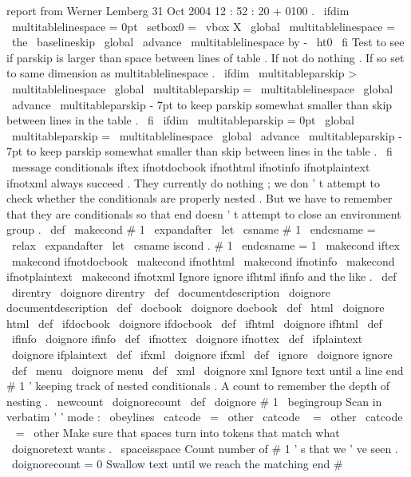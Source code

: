 {{report
from
Werner
Lemberg
31
Oct
2004
12
:
52
:
20
+
0100
.
\
ifdim
\
multitablelinespace
=
0pt
\
setbox0
=
\
vbox
{
X
}
\
global
\
multitablelinespace
=
\
the
\
baselineskip
\
global
\
advance
\
multitablelinespace
by
-
\
ht0
\
fi
%
%
Test
to
see
if
parskip
is
larger
than
space
between
lines
of
%
%
table
.
If
not
do
nothing
.
%
%
If
so
set
to
same
dimension
as
multitablelinespace
.
\
ifdim
\
multitableparskip
>
\
multitablelinespace
\
global
\
multitableparskip
=
\
multitablelinespace
\
global
\
advance
\
multitableparskip
-
7pt
%
%
to
keep
parskip
somewhat
smaller
%
%
than
skip
between
lines
in
the
table
.
\
fi
%
\
ifdim
\
multitableparskip
=
0pt
\
global
\
multitableparskip
=
\
multitablelinespace
\
global
\
advance
\
multitableparskip
-
7pt
%
%
to
keep
parskip
somewhat
smaller
%
%
than
skip
between
lines
in
the
table
.
\
fi
}
\
message
{
conditionals
}
%
iftex
ifnotdocbook
ifnothtml
ifnotinfo
ifnotplaintext
%
ifnotxml
always
succeed
.
They
currently
do
nothing
;
we
don
'
t
%
attempt
to
check
whether
the
conditionals
are
properly
nested
.
But
we
%
have
to
remember
that
they
are
conditionals
so
that
end
doesn
'
t
%
attempt
to
close
an
environment
group
.
%
\
def
\
makecond
#
1
{
%
\
expandafter
\
let
\
csname
#
1
\
endcsname
=
\
relax
\
expandafter
\
let
\
csname
iscond
.
#
1
\
endcsname
=
1
}
\
makecond
{
iftex
}
\
makecond
{
ifnotdocbook
}
\
makecond
{
ifnothtml
}
\
makecond
{
ifnotinfo
}
\
makecond
{
ifnotplaintext
}
\
makecond
{
ifnotxml
}
%
Ignore
ignore
ifhtml
ifinfo
and
the
like
.
%
\
def
\
direntry
{
\
doignore
{
direntry
}
}
\
def
\
documentdescription
{
\
doignore
{
documentdescription
}
}
\
def
\
docbook
{
\
doignore
{
docbook
}
}
\
def
\
html
{
\
doignore
{
html
}
}
\
def
\
ifdocbook
{
\
doignore
{
ifdocbook
}
}
\
def
\
ifhtml
{
\
doignore
{
ifhtml
}
}
\
def
\
ifinfo
{
\
doignore
{
ifinfo
}
}
\
def
\
ifnottex
{
\
doignore
{
ifnottex
}
}
\
def
\
ifplaintext
{
\
doignore
{
ifplaintext
}
}
\
def
\
ifxml
{
\
doignore
{
ifxml
}
}
\
def
\
ignore
{
\
doignore
{
ignore
}
}
\
def
\
menu
{
\
doignore
{
menu
}
}
\
def
\
xml
{
\
doignore
{
xml
}
}
%
Ignore
text
until
a
line
end
#
1
'
keeping
track
of
nested
conditionals
.
%
%
A
count
to
remember
the
depth
of
nesting
.
\
newcount
\
doignorecount
\
def
\
doignore
#
1
{
\
begingroup
%
Scan
in
verbatim
'
'
mode
:
\
obeylines
\
catcode
\
=
\
other
\
catcode
\
{
=
\
other
\
catcode
\
}
=
\
other
%
%
Make
sure
that
spaces
turn
into
tokens
that
match
what
\
doignoretext
wants
.
\
spaceisspace
%
%
Count
number
of
#
1
'
s
that
we
'
ve
seen
.
\
doignorecount
=
0
%
%
Swallow
text
until
we
reach
the
matching
end
#
}}
